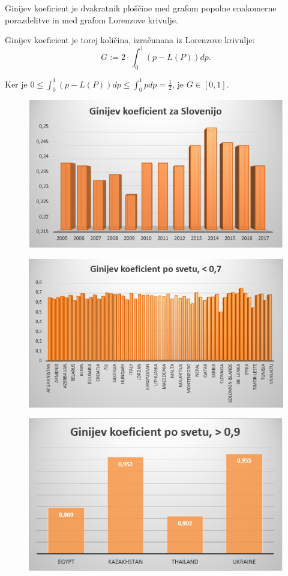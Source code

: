 \documentclass[a4paper,12 pt]{article}
\begin{document}
Ginijev koeficient je dvakratnik ploščine med grafom popolne enakomerne porazdelitve in med grafom Lorenzove krivulje.

Ginijev koeficient je torej količina, izračunana iz Lorenzove krivulje: 
$$G := 2 \cdot \int_{0}^{1} (p - L(P)) dp. $$

Ker je $0 \leq \int_{0}^{1} (p - L(P)) dp \leq \int_{0}^{1} p dp = \frac{1}{2}$, je $G \in [0, 1].$

\begin{figure}
\includegraphics[width= \linewidth]{./slike/gini-slo.png}
\end{figure}

\begin{figure}
\includegraphics[width= \linewidth]{./slike/gini-manj-07.png}
\end{figure}

\begin{figure}
\includegraphics[width= \linewidth]{./slike/gini-vec-09.png}
\end{figure}
\end{document}

